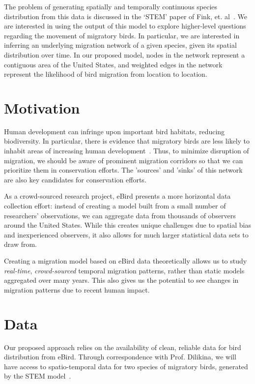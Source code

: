 \documentclass[11pt]{sigplanconf}
\begin{document}
The problem of generating spatially and temporally continuous species distribution from this data is discussed in the `STEM' paper of Fink, et. al~\cite{stem}. We are interested in using the output of this model to explore higher-level questions regarding the movement of migratory birds. In particular, we are interested in inferring an underlying migration network of a given species, given its spatial distribution over time. In our proposed model, nodes in the network represent a contiguous area of the United States, and weighted edges in the network represent the likelihood of bird migration from location to location. 

\section{Motivation}
Human development can infringe upon important bird habitats, reducing biodiversity. In particular, there is evidence that migratory birds are less likely to inhabit areas of increasing human development~\cite{riparian}. Thus, to minimize disruption of migration, we should be aware of prominent migration corridors so that we can prioritize them in conservation efforts. The 'sources' and 'sinks' of this network are also key candidates for conservation efforts.

As a crowd-sourced research project, eBird presents a more horizontal data collection effort: instead of creating a model built from a small number of researchers' observations, we can aggregate data from thousands of observers around the United States. While this creates unique challenges due to spatial bias and inexperienced observers, it also allows for much larger statistical data sets to draw from. 

Creating a migration model based on eBird data theoretically allows us to study \textit{real-time}, \textit{crowd-sourced} temporal migration patterns, rather than static models aggregated over many years. This also gives us the potential to see changes in migration patterns due to recent human impact.

\section{Data}
Our proposed approach relies on the availability of clean, reliable data for bird distribution from eBird. Through correspondence with Prof. Dilikina, we will have access to spatio-temporal data for two species of migratory birds, generated by the STEM model~\cite{stem}. 
\end{document}
